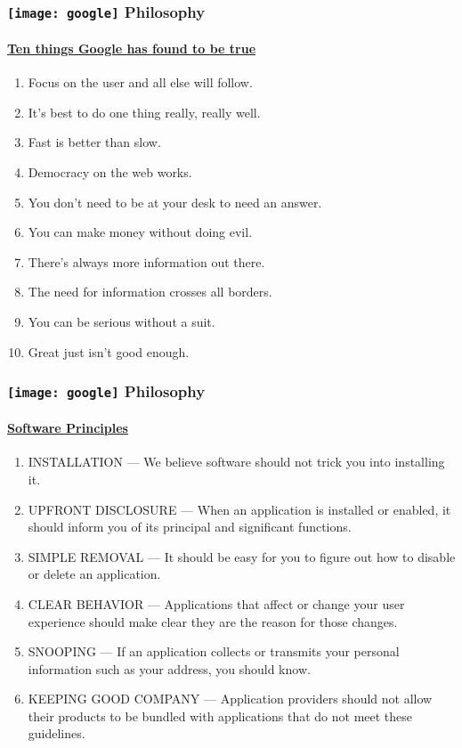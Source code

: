 \documentclass[hyperref={xetex,colorlinks,linkcolor=blue},green,compress]{beamer}
\newcommand\googlelogo{\texttt{[image: google]}}
\begin{document}
\begin{frame}\frametitle{\googlelogo{} Philosophy}
\framesubtitle{\href{http://www.google.com/corporate/tenthings.html}{Ten things Google has found to be true}}

\begin{enumerate}
\item Focus on the user and all else will follow.
\item It's best to do one thing really, really well.
\item Fast is better than slow.
\item Democracy on the web works.
\item You don't need to be at your desk to need an answer.
\item You can make money without doing evil.
\item There's always more information out there.
\item The need for information crosses all borders.
\item You can be serious without a suit.
\item Great just isn't good enough.
\end{enumerate}

\end{frame}

\begin{frame}\frametitle{\googlelogo{} Philosophy}\framesubtitle{\href{http://www.google.com/corporate/software_principles.html}{Software Principles}}                                                                 

\begin{enumerate}
\item  INSTALLATION --- We believe software should not trick you into installing it.
\item UPFRONT DISCLOSURE --- When an application is installed or enabled, it should inform you of its principal and significant functions.
\item SIMPLE REMOVAL --- It should be easy for you to figure out how to disable or delete an application.
\item CLEAR BEHAVIOR --- Applications that affect or change your user experience should make clear they are the reason for those changes.
\item SNOOPING --- If an application collects or transmits your personal information such as your address, you should know.
\item KEEPING GOOD COMPANY --- Application providers should not allow their products to be bundled with applications that do not meet these guidelines.
\end{enumerate}

\end{frame}
\end{document}
